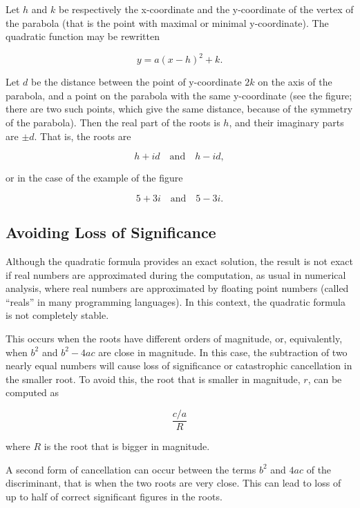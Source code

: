 Let $h$ and $k$ be respectively the x-coordinate and the y-coordinate of the vertex of the parabola (that is the point with maximal or minimal y-coordinate). The quadratic function may be rewritten

\[
y = a(x - h)^2 + k.
\]

Let $d$ be the distance between the point of y-coordinate $2k$ on the axis of the parabola, and a point on the parabola with the same y-coordinate (see the figure; there are two such points, which give the same distance, because of the symmetry of the parabola). Then the real part of the roots is $h$, and their imaginary parts are $\pm d$. That is, the roots are

\[
h + id \quad \text{and} \quad h - id,
\]

or in the case of the example of the figure

\[
5 + 3i \quad \text{and} \quad 5 - 3i.
\]

\subsection{Avoiding Loss of Significance}
\label{sss:avoi-6288}

Although the quadratic formula provides an exact solution, the result is not exact if real
numbers are approximated during the computation, as usual in numerical analysis, where
real numbers are approximated by floating point numbers (called ``reals'' in many
programming languages). In this context, the quadratic formula is not completely stable.

This occurs when the roots have different orders of magnitude, or, equivalently, when $b^2$ and $b^2 - 4ac$ are close in magnitude. In this case, the subtraction of two nearly equal numbers will cause loss of significance or catastrophic cancellation in the smaller root. To avoid this, the root that is smaller in magnitude, $r$, can be computed as 

\[
\frac{c / a}{R}
\] 

where $R$ is the root that is bigger in magnitude.

A second form of cancellation can occur between the terms $b^2$ and $4ac$ of the discriminant, that is when the two roots are very close. This can lead to loss of up to half of correct significant figures in the roots.

